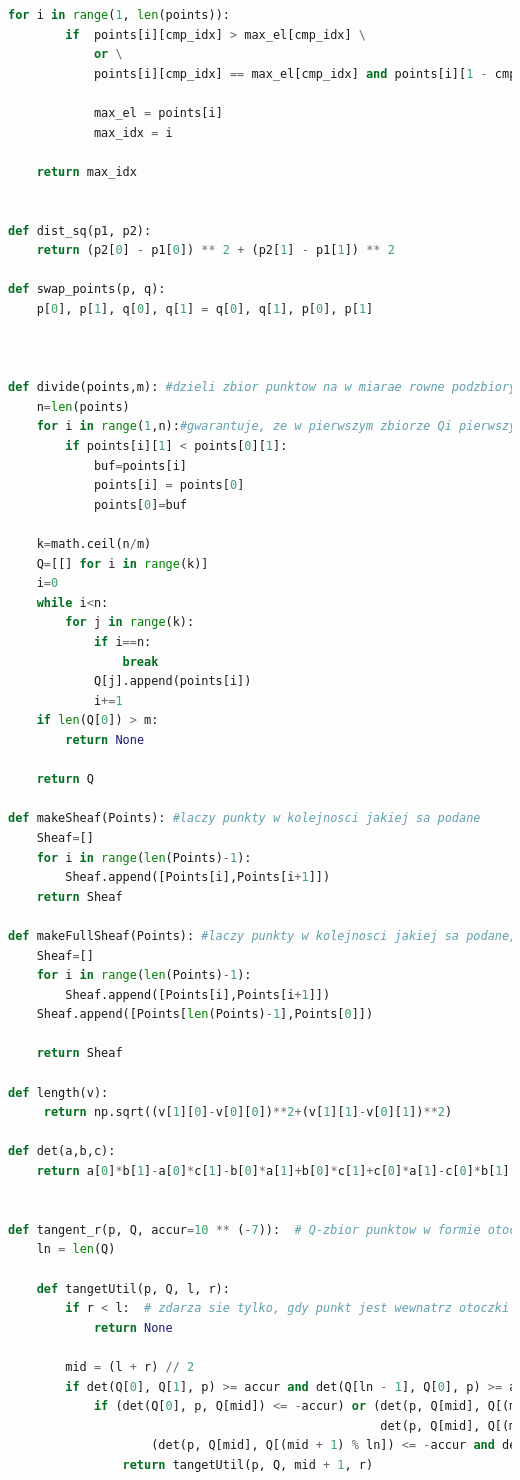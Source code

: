 \documentclass[11pt]{article}
\theoremstyle{remark} \newtheorem{definition}{def.}
\theoremstyle{definition} \newtheorem{twierdzenie}{tw.}
\begin{document}
\begin{lstlisting}[language=Python]
    for i in range(1, len(points)):
        if  points[i][cmp_idx] > max_el[cmp_idx] \
            or \
            points[i][cmp_idx] == max_el[cmp_idx] and points[i][1 - cmp_idx] > max_el[1 - cmp_idx]:
                
            max_el = points[i]
            max_idx = i
            
    return max_idx


def dist_sq(p1, p2):
    return (p2[0] - p1[0]) ** 2 + (p2[1] - p1[1]) ** 2

def swap_points(p, q):
    p[0], p[1], q[0], q[1] = q[0], q[1], p[0], p[1]

    
    
def divide(points,m): #dzieli zbior punktow na w miarae rowne podzbiory o rozmiarze m lub m-1
    n=len(points)
    for i in range(1,n):#gwarantuje, ze w pierwszym zbiorze Qi pierwszy element jest najnizszy, czyli nalezy do otoczki ostatecznej
        if points[i][1] < points[0][1]:
            buf=points[i]
            points[i] = points[0]
            points[0]=buf
            
    k=math.ceil(n/m)
    Q=[[] for i in range(k)]
    i=0
    while i<n:
        for j in range(k):
            if i==n:
                break
            Q[j].append(points[i])
            i+=1
    if len(Q[0]) > m:
        return None
            
    return Q

def makeSheaf(Points): #laczy punkty w kolejnosci jakiej sa podane
    Sheaf=[]
    for i in range(len(Points)-1):
        Sheaf.append([Points[i],Points[i+1]])
    return Sheaf

def makeFullSheaf(Points): #laczy punkty w kolejnosci jakiej sa podane, dodatkowo domyka cylk
    Sheaf=[]
    for i in range(len(Points)-1):
        Sheaf.append([Points[i],Points[i+1]])
    Sheaf.append([Points[len(Points)-1],Points[0]])

    return Sheaf

def length(v):
     return np.sqrt((v[1][0]-v[0][0])**2+(v[1][1]-v[0][1])**2)

def det(a,b,c):
    return a[0]*b[1]-a[0]*c[1]-b[0]*a[1]+b[0]*c[1]+c[0]*a[1]-c[0]*b[1]


def tangent_r(p, Q, accur=10 ** (-7)):  # Q-zbior punktow w formie otoczki
    ln = len(Q)

    def tangetUtil(p, Q, l, r):
        if r < l:  # zdarza sie tylko, gdy punkt jest wewnatrz otoczki
            return None

        mid = (l + r) // 2
        if det(Q[0], Q[1], p) >= accur and det(Q[ln - 1], Q[0], p) >= accur:
            if (det(Q[0], p, Q[mid]) <= -accur) or (det(p, Q[mid], Q[(mid + 1) % ln]) <= -accur and \
                                                    det(p, Q[mid], Q[(mid - 1) % ln]) <= -accur) or \
                    (det(p, Q[mid], Q[(mid + 1) % ln]) <= -accur and det(p, Q[mid], Q[(mid - 1) % ln]) > -accur):
                return tangetUtil(p, Q, mid + 1, r)


\end{lstlisting}
\end{document}
